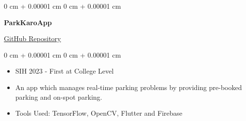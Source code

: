 \documentclass[9pt, letterpaper]{extarticle}
\newenvironment{highlights}{
    \begin{itemize}[
        topsep=0.10 cm,
        parsep=0.10 cm,
        partopsep=0pt,
        itemsep=0pt,
        leftmargin=0 cm + 10pt
    ]
}{
    \end{itemize}
} %
\newenvironment{onecolentry}{
    \begin{adjustwidth}{
        0 cm + 0.00001 cm
    }{
        0 cm + 0.00001 cm
    }
}{
    \end{adjustwidth}
} %
\newenvironment{twocolentry}[2][]{
    \onecolentry
    \def\secondColumn{#2}
    \setcolumnwidth{\fill, 4.5 cm}
    \begin{paracol}{2}
}{
    \switchcolumn \raggedleft \secondColumn
    \end{paracol}
    \endonecolentry
} %
\begin{document}
\begin{twocolentry}{
    \href{https://github.com/debarshee2004/parkkaroapp}{GitHub Repository}
}
    \textbf{ParkKaroApp}
\end{twocolentry}

\vspace{0.10 cm}

\begin{onecolentry}
    \begin{highlights}
        \item SIH 2023 - First at College Level
        \item An app which manages real-time parking problems by providing pre-booked parking and on-spot parking.
        \item Tools Used: TensorFlow, OpenCV, Flutter and Firebase
    \end{highlights}
\end{onecolentry}
\end{document}
